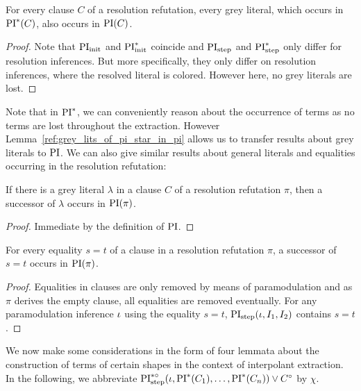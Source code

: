 \documentclass[,%
	draft=false,%
	numbers=noendperiod
	12pt,
	a4paper,
	oneside,%
	openany,
]{memoir}
\newcommand{\inv}{\ensuremath{\chi}}
\begin{document}
\begin{lemma}
	\label{lemma:grey_lits_of_pi_star_in_pi}
	For every clause $C$ of a resolution refutation,
	every grey literal, which occurs in $\operatorname{PI}^*(C)$, also occurs in $\operatorname{PI}(C)$.
\end{lemma}
\begin{proof}
	Note that $\operatorname{PI}_{\mathrm{init}}$ and $\operatorname{PI}_{\mathrm{init}}^*$ coincide and $\operatorname{PI}_{\mathrm{step}}$ and $\operatorname{PI}_{\mathrm{step}}^*$ only differ for resolution inferences.
	But more specifically, they only differ on resolution inferences, where the resolved literal is colored. However here, no grey literals are lost.
\end{proof}

Note that in $\operatorname{PI}^*$, we can conveniently reason about the occurrence of terms as no terms are lost throughout the extraction.
However Lemma~\ref{ref:grey_lits_of_pi_star_in_pi} allows us to transfer results about grey literals to $\operatorname{PI}$.
We can also give similar results about general literals and equalities occurring in the resolution refutation:

\begin{lemma}
	\label{lemma:grey_lits_all_in_PI}
	If there is a grey literal $\lambda$ in a clause $C$ of a resolution refutation $\pi$,
	then a successor of $\lambda$ occurs in $\operatorname{PI}(\pi)$.
\end{lemma}
\begin{proof}
	Immediate by the definition of $\operatorname{PI}$.
\end{proof}

\begin{lemma}
	\label{lemma:equalities_all_in_PI}
	For every equality $s=t$ of a clause in a resolution refutation $\pi$,
	a successor of $s=t$ occurs in $\operatorname{PI}(\pi)$.
\end{lemma}
\begin{proof}
	Equalities in clauses are only removed by means of paramodulation and as $\pi$ derives the empty clause, all equalities are removed eventually.
	For any paramodulation inference $\iota$ using the equality $s=t$, $\operatorname{PI}_{\mathrm{step}}(\iota, I_1, I_2)$ contains $s=t$. 
\end{proof}


We now make some considerations in the form of four lemmata about the construction of terms of certain shapes in the context of interpolant extraction.
In the following, we abbreviate $\operatorname{PI}^{*\circ}_{\mathrm{step}}(\iota, \operatorname{PI}^*(C_1), \dots, \operatorname{PI}^*(C_n)) \lor C^\circ$ by $\inv$.
\end{document}
